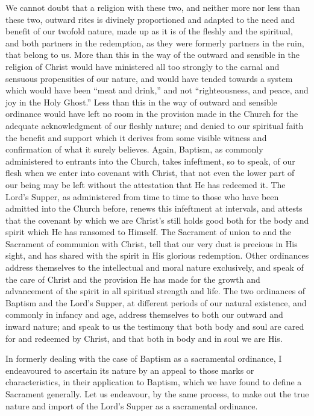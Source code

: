 \documentclass[
]{book}
\begin{document}
We cannot doubt that a religion with these two, and neither more nor less than these two, outward rites is divinely proportioned and adapted to the need and benefit of our twofold nature, made up as it is of the fleshly and the spiritual, and both partners in the redemption, as they were formerly partners in the ruin, that belong to us. More than this in the way of the outward and sensible in the religion of Christ would have ministered all too strongly to the carnal and sensuous propensities of our nature, and would have tended towards a system which would have been ``meat and drink,'' and not ``righteousness, and peace, and joy in the Holy Ghost.'' Less than this in the way of outward and sensible ordinance would have left no room in the provision made in the Church for the adequate acknowledgment of our fleshly nature; and denied to our spiritual faith the benefit and support which it derives from some visible witness and confirmation of what it surely believes. Again, Baptism, as commonly administered to entrants into the Church, takes infeftment, so to speak, of our flesh when we enter into covenant with Christ, that not even the lower part of our being may be left without the attestation that He has redeemed it. The Lord's Supper, as administered from time to time to those who have been admitted into the Church before, renews this infeftment at intervals, and attests that the covenant by which we are Christ's still holds good both for the body and spirit which He has ransomed to Himself. The Sacrament of union to and the Sacrament of communion with Christ, tell that our very dust is precious in His sight, and has shared with the spirit in His glorious redemption. Other ordinances address themselves to the intellectual and moral nature exclusively, and speak of the care of Christ and the provision He has made for the growth and advancement of the spirit in all spiritual strength and life. The two ordinances of Baptism and the Lord's Supper, at different periods of our natural existence, and commonly in infancy and age, address themselves to both our outward and inward nature; and speak to us the testimony that both body and soul are cared for and redeemed by Christ, and that both in body and in soul we are His.

In formerly dealing with the case of Baptism as a sacramental ordinance, I endeavoured to ascertain its nature by an appeal to those marks or characteristics, in their application to Baptism, which we have found to define a Sacrament generally. Let us endeavour, by the same process, to make out the true nature and import of the Lord's Supper as a sacramental ordinance.
\end{document}
